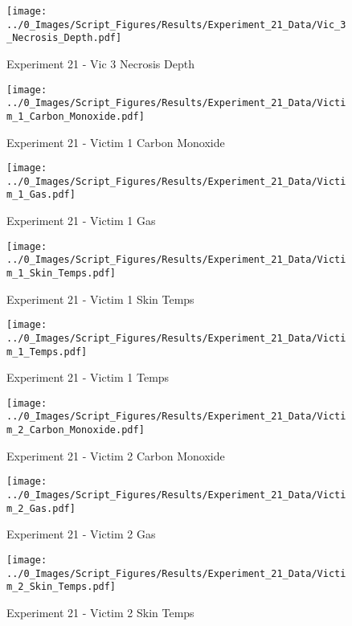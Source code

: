 	\clearpage

	\begin{figure}[H]
		\centering
		\texttt{[image: ../0\_Images/Script\_Figures/Results/Experiment\_21\_Data/Vic\_3\_Necrosis\_Depth.pdf]}
		\caption[]{Experiment 21 - Vic 3 Necrosis Depth}
	\end{figure}
 

	\begin{figure}[H]
		\centering
		\texttt{[image: ../0\_Images/Script\_Figures/Results/Experiment\_21\_Data/Victim\_1\_Carbon\_Monoxide.pdf]}
		\caption[]{Experiment 21 - Victim 1 Carbon Monoxide}
	\end{figure}
 
	\clearpage

	\begin{figure}[H]
		\centering
		\texttt{[image: ../0\_Images/Script\_Figures/Results/Experiment\_21\_Data/Victim\_1\_Gas.pdf]}
		\caption[]{Experiment 21 - Victim 1 Gas}
	\end{figure}
 

	\begin{figure}[H]
		\centering
		\texttt{[image: ../0\_Images/Script\_Figures/Results/Experiment\_21\_Data/Victim\_1\_Skin\_Temps.pdf]}
		\caption[]{Experiment 21 - Victim 1 Skin Temps}
	\end{figure}
 
	\clearpage

	\begin{figure}[H]
		\centering
		\texttt{[image: ../0\_Images/Script\_Figures/Results/Experiment\_21\_Data/Victim\_1\_Temps.pdf]}
		\caption[]{Experiment 21 - Victim 1 Temps}
	\end{figure}
 

	\begin{figure}[H]
		\centering
		\texttt{[image: ../0\_Images/Script\_Figures/Results/Experiment\_21\_Data/Victim\_2\_Carbon\_Monoxide.pdf]}
		\caption[]{Experiment 21 - Victim 2 Carbon Monoxide}
	\end{figure}
 
	\clearpage

	\begin{figure}[H]
		\centering
		\texttt{[image: ../0\_Images/Script\_Figures/Results/Experiment\_21\_Data/Victim\_2\_Gas.pdf]}
		\caption[]{Experiment 21 - Victim 2 Gas}
	\end{figure}
 

	\begin{figure}[H]
		\centering
		\texttt{[image: ../0\_Images/Script\_Figures/Results/Experiment\_21\_Data/Victim\_2\_Skin\_Temps.pdf]}
		\caption[]{Experiment 21 - Victim 2 Skin Temps}
	\end{figure}
 
